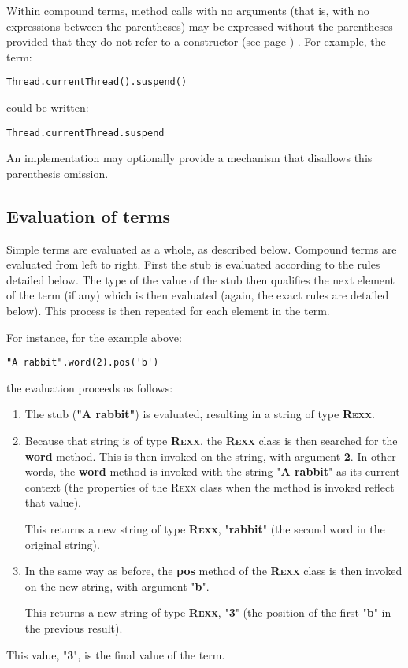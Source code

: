 Within compound terms, method calls with no arguments (that is, with no
expressions between the parentheses) may be expressed without the
parentheses provided that they do not refer to a
 constructor (see page \pageref{refcons}) .
For example, the term:
\begin{lstlisting}
Thread.currentThread().suspend()
\end{lstlisting}
could be written:
\begin{lstlisting}
Thread.currentThread.suspend
\end{lstlisting}
An implementation may optionally provide a mechanism that disallows this
parenthesis omission.
\subsection{Evaluation of terms}\label{refteval}
 
Simple terms are evaluated as a whole, as described below.
Compound terms are evaluated from left to right.  First the stub is
evaluated according to the rules detailed below.
The type of the value of the stub then qualifies the next element of the
term (if any) which is then evaluated (again, the exact rules are
detailed below).
This process is then repeated for each element in the term.
 
For instance, for the example above:
\begin{lstlisting}
"A rabbit".word(2).pos('b')
\end{lstlisting}
the evaluation proceeds as follows:
\begin{enumerate}
\item The stub (\textbf{"A rabbit"}) is evaluated, resulting in a string
of type \textbf{R\textsc{exx}}.
\item 
Because that string is of type \textbf{R\textsc{exx}}, the \textbf{R\textsc{exx}} class
is then searched for the \textbf{word} method.  This is then invoked
on the string, with argument \textbf{2}.
In other words, the \textbf{word} method is invoked with the string
"\textbf{A rabbit}" as its current context (the properties of the
R\textsc{exx} class when the method is invoked reflect that value).
 
This returns a new string of type \textbf{R\textsc{exx}},
"\textbf{rabbit}" (the second word in the original string).
\item 
In the same way as before, the \textbf{pos} method of
the \textbf{R\textsc{exx}} class is then invoked on the new string, with
argument "\textbf{b}".
 
This returns a new string of type \textbf{R\textsc{exx}}, "\textbf{3}"
(the position of the first "\textbf{b}" in the previous result).
\end{enumerate}
This value, "\textbf{3}", is the final value of the term.
 
